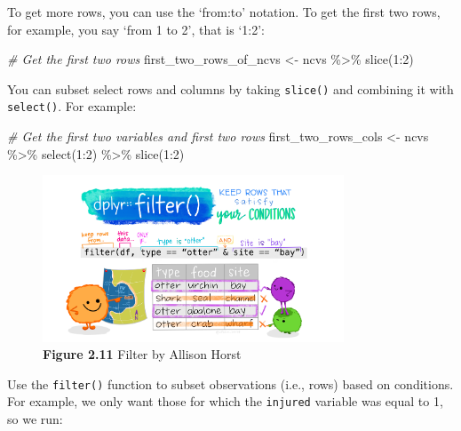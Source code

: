 \documentclass[
]{book}
\newenvironment{Shaded}{\begin{snugshade}}{\end{snugshade}}
\newcommand{\CommentTok}[1]{\textcolor[rgb]{0.56,0.35,0.01}{\textit{#1}}}
\newcommand{\DecValTok}[1]{\textcolor[rgb]{0.00,0.00,0.81}{#1}}
\newcommand{\FunctionTok}[1]{\textcolor[rgb]{0.00,0.00,0.00}{#1}}
\newcommand{\NormalTok}[1]{#1}
\newcommand{\OtherTok}[1]{\textcolor[rgb]{0.56,0.35,0.01}{#1}}
\newcommand{\SpecialCharTok}[1]{\textcolor[rgb]{0.00,0.00,0.00}{#1}}
\begin{document}
To get more rows, you can use the `from:to' notation. To get the first two rows, for example, you say `from 1 to 2', that is `1:2':

\begin{Shaded}
\begin{Highlighting}[]
\CommentTok{\# Get the first two rows }
\NormalTok{first\_two\_rows\_of\_ncvs }\OtherTok{\textless{}{-}}\NormalTok{ ncvs }\SpecialCharTok{\%\textgreater{}\%} \FunctionTok{slice}\NormalTok{(}\DecValTok{1}\SpecialCharTok{:}\DecValTok{2}\NormalTok{) }
\end{Highlighting}
\end{Shaded}

You can subset select rows and columns by taking \texttt{slice()} and combining it with \texttt{select()}. For example:

\begin{Shaded}
\begin{Highlighting}[]
\CommentTok{\# Get the first two variables and first two rows }
\NormalTok{first\_two\_rows\_cols }\OtherTok{\textless{}{-}}\NormalTok{ ncvs }\SpecialCharTok{\%\textgreater{}\%} \FunctionTok{select}\NormalTok{(}\DecValTok{1}\SpecialCharTok{:}\DecValTok{2}\NormalTok{) }\SpecialCharTok{\%\textgreater{}\%} \FunctionTok{slice}\NormalTok{(}\DecValTok{1}\SpecialCharTok{:}\DecValTok{2}\NormalTok{)}
\end{Highlighting}
\end{Shaded}

\begin{figure}
\centering
\includegraphics[width=0.8\textwidth,height=\textheight]{Images/dplyr_filter.jpg}
\caption{\textbf{Figure 2.11} Filter by Allison Horst}
\end{figure}

Use the \texttt{filter()} function to subset observations (i.e., rows) based on conditions. For example, we only want those for which the \texttt{injured} variable was equal to 1, so we run:
\end{document}
